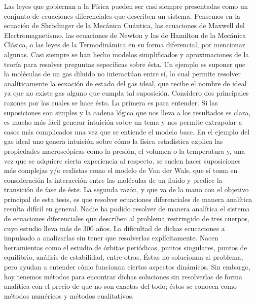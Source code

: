 Las leyes que gobiernan a la Física pueden ser casi siempre presentadas como un conjunto de ecuaciones diferenciales que describen un sistema. Pensemos en la ecuación de Shrödinger de la Mecánica Cuántica, las ecuaciones de Maxwell del Electromagnetismo, las ecuaciones de Newton y las de Hamilton de la Mecánica Clásica, o las leyes de la Termodinámica en su forma diferencial, por mencionar algunas. Casi siempre se han hecho modelos simplificados y aproximaciones de la teoría para resolver preguntas específicas sobre ésta. Un ejemplo es suponer que la moléculas de un gas diluido no interactúan entre sí, lo cual permite resolver analíticamente la ecuación de estado del gas ideal, que recibe el nombre de ideal ya que no existe gas alguno que cumpla tal suposición. Considero dos principales razones por las cuales se hace ésto. La primera es para entender. Si las suposiciones son simples y la cadena lógica que nos lleva a los resultados es clara, es mucho más fácil generar intuición sobre un tema y nos permite extrapolar a casos más complicados una vez que se entiende el modelo base. En el ejemplo del gas ideal uno genera intuición sobre cómo la física estadística explica las propiedades macroscópicas como la presión, el volumen o la temperatura y, una vez que se adquiere cierta experiencia al respecto, se suelen hacer suposiciones más complejas y/o realistas como el modelo de Van der Wals, que sí toma en consideración la interacción entre las moléculas de un fluido y predice la transición de fase de éste. La segunda razón, y que va de la mano con el objetivo principal de esta tesis, es que resolver ecuaciones diferenciales de manera analítica resulta difícil en general. Nadie ha podido resolver de manera analítica el sistema de ecuaciones diferenciales que describen al problema restringido de tres cuerpos, cuyo estudio lleva más de 300 años. La dificultad de dichas ecucaciones a impulsado a analizarlas sin tener que resolverlas explícitamente. Nacen herramientas como el estudio de órbitas periódicas, puntos singulares, puntos de equilibrio, análisis de estabilidad, entre otras. Éstas no solucionan al problema, pero ayudan a entender cómo funcionan ciertos aspectos dinámicos. Sin embargo, hoy tenemos métodos para encontrar dichas soluciones sin resolverlas de forma analítica con el precio de que no son exactas del todo; éstos se conocen como métodos numéricos y métodos cualitativos.

